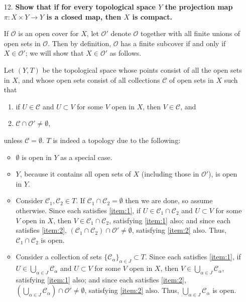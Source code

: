 \documentclass[a4paper,12pt]{article}
\begin{document}
\begin{enumerate}
    \item[12.]
        \boldmath\textbf{Show that if for every topological space $Y$ the projection map $\pi : X \times Y \to Y$ is a closed map, then $X$ is compact.
        }\unboldmath \par
        If $\mathcal{O}$ is an open cover for $X$, let $\mathcal{O}'$ denote $\mathcal{O}$ together with all finite unions of open sets in $\mathcal{O}$. Then by definition, $\mathcal{O}$ has a finite subcover if and only if $X \in \mathcal{O}'$; we will show that $X \in \mathcal{O}'$ as follows. \par
        Let $(Y, T)$ be the topological space whose points consist of all the open sets in $X$, and whose open sets consist of all collections $\mathcal{C}$ of open sets in $X$ such that
        \begin{enumerate}[label=(\roman*)]
            \item \label{item:1}
                if $U \in \mathcal{C}$ and $U \subset V$ for some $V$ open in $X$, then $V \in \mathcal{C}$, and
            \item \label{item:2}
                $\mathcal{C} \cap \mathcal{O}' \neq \emptyset$,
        \end{enumerate}
        unless $\mathcal{C} = \emptyset$. $T$ is indeed a topology due to the following:
        \begin{itemize}
            \item
                $\emptyset$ is open in $Y$ as a special case.
            \item
                $Y$, because it contains all open sets of $X$ (including those in $\mathcal{O}'$), is open in $Y$.
            \item
                Consider $\mathcal{C}_1, \mathcal{C}_2 \in T$. If $\mathcal{C}_1 \cap \mathcal{C}_2 = \emptyset$ then we are done, so assume otherwise. Since each satisfies \ref{item:1}, if $U \in \mathcal{C}_1 \cap \mathcal{C}_2$ and $U \subset V$ for some $V$ open in $X$, then $V \in \mathcal{C}_1 \cap \mathcal{C}_2$, satisfying \ref{item:1} also; and since each satisfies \ref{item:2}, $(\mathcal{C}_1 \cap \mathcal{C}_2) \cap \mathcal{O}' \neq \emptyset$, satisfying \ref{item:2} also. Thus, $\mathcal{C}_1 \cap \mathcal{C}_2$ is open.
            \item
                Consider a collection of sets $\{ \mathcal{C}_\alpha \}_{\alpha \in J} \subset T$. Since each satisfies \ref{item:1}, if $U \in \bigcup_{\alpha \in J} \mathcal{C}_\alpha$ and $U \subset V$ for some $V$ open in $X$, then $V \in \bigcup_{\alpha \in J} \mathcal{C}_\alpha$, satisfying \ref{item:1} also; and since each satisfies \ref{item:2}, $(\bigcup_{\alpha \in J} \mathcal{C}_\alpha) \cap \mathcal{O}' \neq \emptyset$, satisfying \ref{item:2} also. Thus, $\bigcup_{\alpha \in J} \mathcal{C}_\alpha$ is open.

\end{itemize}
\end{enumerate}
\end{document}
